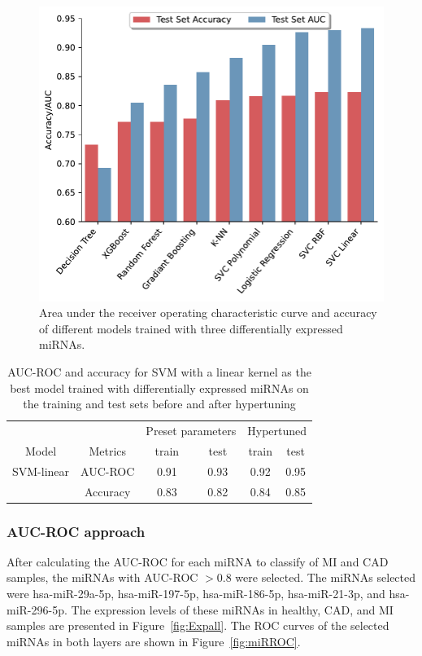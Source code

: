 \documentclass[sn-mathphys,Numbered]{sn-jnl}%
\theoremstyle{thmstyleone}%
\theoremstyle{thmstyletwo}%
\theoremstyle{thmstylethree}%
\begin{document}
\begin{figure}
\centering
\includegraphics[width=0.65\linewidth]{Models DEGs mirs}
\caption{Area under the receiver operating characteristic curve and accuracy of different models trained with three differentially expressed miRNAs.}\label{fig:DEMmodels}
\end{figure}


\begin{table}
\centering
\caption{AUC-ROC and accuracy for SVM with a linear kernel as the best model trained with differentially expressed miRNAs on the training and test sets before and after hypertuning}
\label{tab:DEGsML}
\begin{tabular}{cccccc}
\toprule
\multicolumn{2}{c}{} & \multicolumn{2}{c}{Preset parameters} & \multicolumn{2}{c}{Hypertuned} \\
\cmidrule(lr){3-4} \cmidrule(lr){5-6}
Model & Metrics & train & test & train & test\\
\midrule
SVM-linear & AUC-ROC & 0.91 & 0.93 & 0.92 & 0.95\\
& Accuracy & 0.83 & 0.82 & 0.84 & 0.85\\
\bottomrule
\end{tabular}
\end{table}

\subsubsection{AUC-ROC approach}\label{auc-roc-approach}

After calculating the AUC-ROC for each miRNA to classify of MI and CAD
samples, the miRNAs with AUC-ROC $> 0.8$ were selected. The miRNAs
selected were hsa-miR-29a-5p, hsa-miR-197-5p, hsa-miR-186-5p, hsa-miR-21-3p, and hsa-miR-296-5p. The
expression levels of these miRNAs in healthy, CAD, and MI samples are
presented in Figure~\ref{fig:Expall}. The ROC curves of the selected
miRNAs in both layers are shown in Figure~\ref{fig:miRROC}.
\end{document}

